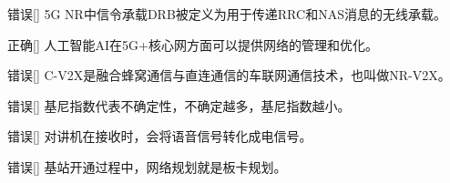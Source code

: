 \begin{choice}{\;错误\;}[]
    5G NR中信令承载DRB被定义为用于传递RRC和NAS消息的无线承载。

\end{choice}

\begin{choice}{\;正确\;}[]
    人工智能AI在5G+核心网方面可以提供网络的管理和优化。

\end{choice}

\begin{choice}{\;错误\;}[]
    C-V2X是融合蜂窝通信与直连通信的车联网通信技术，也叫做NR-V2X。

\end{choice}

\begin{choice}{\;错误\;}[]
    基尼指数代表不确定性，不确定越多，基尼指数越小。

\end{choice}

\begin{choice}{\;错误\;}[]
    对讲机在接收时，会将语音信号转化成电信号。

\end{choice}

\begin{choice}{\;错误\;}[]
    基站开通过程中，网络规划就是板卡规划。

\end{choice}






